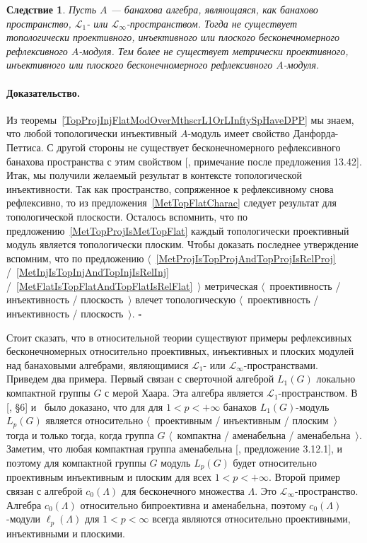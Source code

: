 \documentclass[12pt]{article}
\newtheorem{corollary}[theorem]{Следствие}
\renewenvironment{proof}{\paragraph{Доказательство.}}{\hfill$\square$\medskip}
\begin{document}
\begin{corollary}\label{NoInfDimRefMetTopProjInjFlatModOverMthscrL1OrLInfty}
    Пусть $A$ --- банахова алгебра, являющаяся, как банахово пространство,
    $\mathscr{L}_1$- или $\mathscr{L}_\infty$-пространством. Тогда не существует
    топологически проективного, инъективного или плоского бесконечномерного
    рефлексивного $A$-модуля. Тем более не существует метрически проективного,
    инъективного или плоского бесконечномерного рефлексивного $A$-модуля.
\end{corollary}
\begin{proof} Из теоремы~\ref{TopProjInjFlatModOverMthscrL1OrLInftySpHaveDPP} мы
    знаем, что любой топологически инъективный $A$-модуль имеет свойство
    Данфорда-Петтиса. С другой стороны не существует бесконечномерного
    рефлексивного банахова пространства с этим свойством [\cite{FabHabBanSpTh},
    примечание после предложения 13.42]. Итак, мы получили желаемый результат в
    контексте топологической инъективности. Так как пространство, сопряженное к
    рефлексивному снова рефлексивно, то из предложения~\ref{MetTopFlatCharac}
    следует результат для топологической плоскости. Осталось вспомнить, что по
    предложению~\ref{MetTopProjIsMetTopFlat} каждый топологически проективный
    модуль является топологически плоским. Чтобы доказать последнее утверждение
    вспомним, что по предложению
    $\langle$~\ref{MetProjIsTopProjAndTopProjIsRelProj}
    /~\ref{MetInjIsTopInjAndTopInjIsRelInj}
    /~\ref{MetFlatIsTopFlatAndTopFlatIsRelFlat}~$\rangle$ метрическая
    $\langle$~проективность / инъективность / плоскость~$\rangle$ влечет
    топологическую $\langle$~проективность / инъективность /
    плоскость~$\rangle$.
\end{proof}

Стоит сказать, что в относительной теории существуют примеры рефлексивных
бесконечномерных относительно проективных, инъективных и плоских модулей над
банаховыми алгебрами, являющимися $\mathscr{L}_1$- или
$\mathscr{L}_\infty$-пространствами. Приведем два примера. Первый связан с
сверточной алгеброй $L_1(G)$ локально компактной группы $G$ с мерой Хаара. Эта
алгебра является $\mathscr{L}_1$-пространством. В [\cite{DalPolHomolPropGrAlg},
\S6] и~\cite{RachInjModAndAmenGr} было доказано, что для для $1<p<+\infty$
банахов $L_1(G)$-модуль $L_p(G)$ является относительно $\langle$~проективным /
инъективным / плоским~$\rangle$ тогда и только тогда, когда группа $G$
$\langle$~компактна / аменабельна / аменабельна~$\rangle$. Заметим, что любая
компактная группа аменабельна [\cite{PierAmenLCA}, предложение 3.12.1], и
поэтому для компактной группы $G$ модуль $L_p(G)$ будет относительно проективным
инъективным и плоским для всех $1<p<+\infty$. Второй пример связан с алгеброй
$c_0(\Lambda)$ для бесконечного множества $\Lambda$. Это
$\mathscr{L}_\infty$-пространство. Алгебра $c_0(\Lambda)$ относительно
бипроективна и аменабельна, поэтому $c_0(\Lambda)$-модули $\ell_p(\Lambda)$ для
$1<p<\infty$ всегда являются относительно проективными, инъективными и плоскими.



\end{document}

